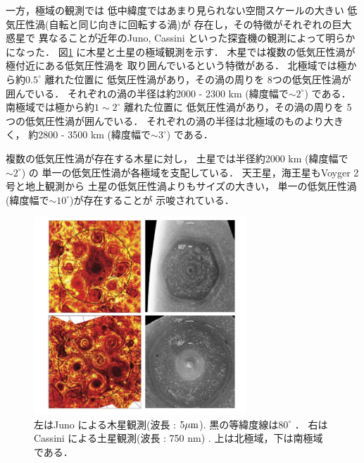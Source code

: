 \documentclass[a4j,12pt,openbib,oneside]{jreport}
\begin{document}
\clearpage
%
一方，極域の観測では
低中緯度ではあまり見られない空間スケールの大きい
低気圧性渦(自転と同じ向きに回転する渦)が
存在し，その特徴がそれぞれの巨大惑星で
異なることが近年のJuno, Cassini といった探査機の観測によって明らかになった．
%
図\ref{fig2} に木星と土星の極域観測を示す．
木星では複数の低気圧性渦が極付近にある低気圧性渦を
取り囲んでいるという特徴がある．
%
北極域では極から約$0.5^\circ$ 離れた位置に
低気圧性渦があり，その渦の周りを
8つの低気圧性渦が囲んでいる．
それぞれの渦の半径は約2000 - 2300 km (緯度幅で$\sim 2^\circ$) である．
%
南極域では極から約$1 \sim 2 ^\circ$ 離れた位置に
低気圧性渦があり，その渦の周りを
5つの低気圧性渦が囲んでいる．
それぞれの渦の半径は北極域のものより大きく，
約2800 - 3500 km (緯度幅で$\sim 3^\circ$) である\citep{Adriani2018}．

複数の低気圧性渦が存在する木星に対し，
土星では半径約2000 km (緯度幅で$\sim 2^\circ$) の
単一の低気圧性渦が各極域を支配している．
%
天王星，海王星もVoyger 2号と地上観測から
土星の低気圧性渦よりもサイズの大きい，
単一の低気圧性渦(緯度幅で$\sim 10^\circ$)が存在することが
示唆されている．
%
\begin{figure}[t]
  \begin{center}
    \includegraphics[clip,width=8cm]{./fig/intro/fig2.png}
    \caption{
      \footnotesize{左はJuno による木星観測(波長 : $5 \rm{\mu m}$).
黒の等緯度線は$80^\circ$ \citep{Adriani2018}．
右はCassini による土星観測(波長 : 750 nm) \citep{Antuano2015}.
上は北極域，下は南極域である．
      }
    }
    \label{fig2}
  \end{center}
\end{figure}
%
%
\end{document}
